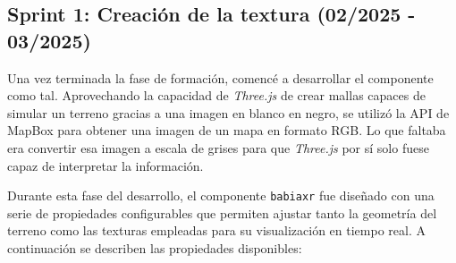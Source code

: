 \documentclass[a4paper, 12pt]{book}
\begin{document}
 


\subsection{Sprint 1: Creación de la textura (02/2025 - 03/2025)}
\label{subsec:canva-f3-s1}

Una vez terminada la fase de formación, comencé a desarrollar el componente como tal. Aprovechando la capacidad de \textit{Three.js} de crear mallas capaces de simular un terreno gracias a una imagen en blanco en negro, se utilizó la API de MapBox para obtener una imagen de un mapa en formato RGB. Lo que faltaba era convertir esa imagen a escala de grises para que \textit{Three.js} por sí solo fuese capaz de interpretar la información.

Durante esta fase del desarrollo, el componente \texttt{babiaxr} fue diseñado con una serie de propiedades configurables que permiten ajustar tanto la geometría del terreno como las texturas empleadas para su visualización en tiempo real. A continuación se describen las propiedades disponibles:
\end{document}
